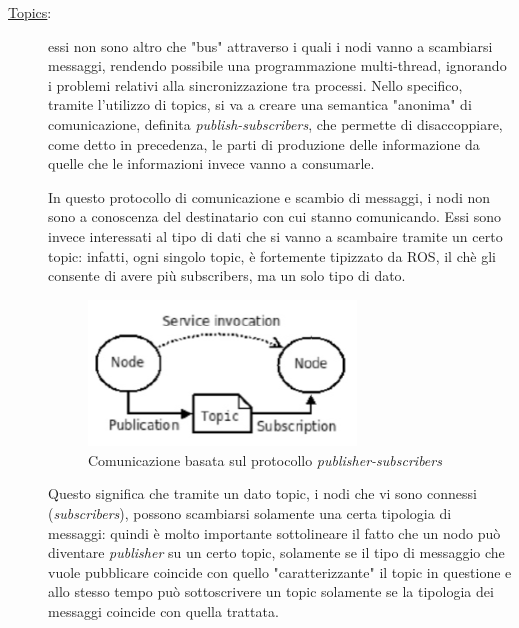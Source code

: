 \begin{description}
	\item[\underline{Topics}:] essi non sono altro che "bus" attraverso i quali i nodi vanno a scambiarsi messaggi, rendendo possibile una programmazione multi-thread, ignorando i problemi relativi alla sincronizzazione tra processi. Nello specifico, tramite l'utilizzo di topics, si va a creare una semantica "anonima" di comunicazione, definita \emph{publish-subscribers}\label{text:pubsub}, che permette di disaccoppiare, come detto in precedenza, le parti di produzione delle informazione da quelle che le informazioni invece vanno a consumarle.
	
	In questo protocollo di comunicazione e scambio di messaggi, i nodi non sono a conoscenza del destinatario con cui stanno comunicando. Essi sono invece interessati al tipo di dati che si vanno a scambaire tramite un certo topic: infatti, ogni singolo topic, è fortemente tipizzato da ROS, il chè gli consente di avere più subscribers, ma un solo tipo di dato.
	\begin{figure}[h]
		\centering
		\includegraphics[width=0.70\textwidth]{Immagini/PubSub}
		\caption{Comunicazione basata sul protocollo \emph{publisher-subscribers}}
		\label{fig:PubSub}
	\end{figure}
	
	Questo significa che tramite un dato topic, i nodi che vi sono connessi (\emph{subscribers}), possono scambiarsi solamente una certa tipologia di messaggi: quindi è molto importante sottolineare il fatto che un nodo può diventare \emph{publisher} su un certo topic, solamente se il tipo di messaggio che vuole pubblicare coincide con quello "caratterizzante" il topic in questione e allo stesso tempo può sottoscrivere un topic solamente se la tipologia dei messaggi coincide con quella trattata.
	

\end{description}
